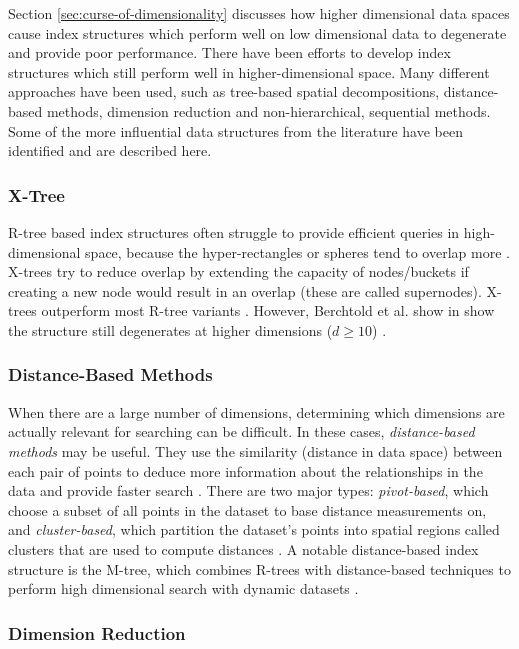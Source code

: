 Section \ref{sec:curse-of-dimensionality} discusses how higher dimensional data spaces cause index structures which perform well on low dimensional data to degenerate and provide poor performance. There have been efforts to develop index structures which still perform well in higher-dimensional space. Many different approaches have been used, such as tree-based spatial decompositions, distance-based methods, dimension reduction and non-hierarchical, sequential methods. Some of the more influential data structures from the literature have been identified and are described here.

\subsubsection{X-Tree}

R-tree based index structures often struggle to provide efficient queries in high-dimensional space, because the hyper-rectangles or spheres tend to overlap more \cite{pyramid-tree}. X-trees \cite{x-tree} try to reduce overlap by extending the capacity of nodes/buckets if creating a new node would result in an overlap (these are called supernodes). X-trees outperform most R-tree variants \cite{x-tree}. However, Berchtold et al. show in  \cite{pyramid-tree} show the structure still degenerates at higher dimensions ($d \geq 10$) \cite{pyramid-tree}.

\subsubsection{Distance-Based Methods}

When there are a large number of dimensions, determining which dimensions are actually relevant for searching can be difficult. In these cases, \textit{distance-based methods} may be useful. They use the similarity (distance in data space) between each pair of points to deduce more information about the relationships in the data and provide faster search \cite{md-structures-samet}. There are two major types: \textit{pivot-based}, which choose a subset of all points in the dataset to base distance measurements on, and \textit{cluster-based}, which partition the dataset's points into spatial regions called clusters that are used to compute distances \cite{md-structures-samet}. A notable distance-based index structure is the M-tree, which combines R-trees with distance-based techniques to perform high dimensional search with dynamic datasets \cite{m-tree}.

\subsubsection{Dimension Reduction}

